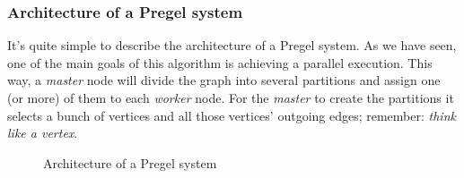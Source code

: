 \subsubsection{Architecture of a Pregel system}
\label{section:architecture:pregel}

It's quite simple to describe the architecture of a Pregel system. As we have seen, one of the main goals of this algorithm is achieving a parallel execution. This way, a \textit{master} node will divide the graph into several partitions and assign one (or more) of them to each \textit{worker} node. For the \textit{master} to create the partitions it selects a bunch of vertices and all those vertices' outgoing edges; remember: \textit{think like a vertex}.

\begin{figure}[h]
    \centering
    
    \caption[Architecture of a Pregel system]{Architecture of a Pregel system~\cite{10.1145/3349265}}
    \label{fig:architecture:pregel}
\end{figure}
